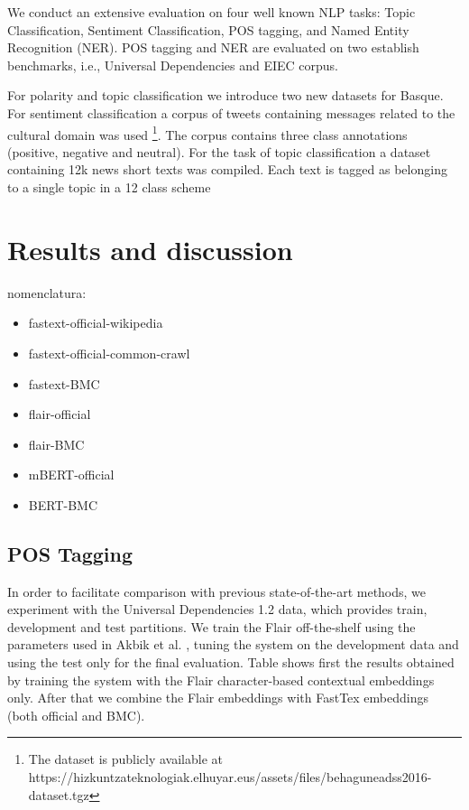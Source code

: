\documentclass[10pt, a4paper]{article}
\begin{document}
We conduct an extensive evaluation on four well known NLP tasks: Topic Classification, Sentiment Classification, POS tagging, and Named Entity Recognition (NER). POS tagging and NER are evaluated on two establish benchmarks, i.e., Universal Dependencies and EIEC corpus. 

For polarity and topic classification we introduce two new datasets for Basque. For sentiment classification a corpus of tweets containing messages related to the cultural domain was used \cite{san2019multilingual}\footnote{The dataset is publicly available at https://hizkuntzateknologiak.elhuyar.eus/assets/files/behaguneadss2016-dataset.tgz}. The corpus contains three class annotations (positive, negative and neutral). For the task of topic classification a dataset containing 12k news short texts was compiled. Each text is tagged as belonging to a single topic in a 12 class scheme



\section{Results and discussion}\label{sec:results-discussion}

nomenclatura: \begin{itemize}
    \item fastext-official-wikipedia 
    \item fastext-official-common-crawl 
    \item fastext-BMC
    \item flair-official
    \item flair-BMC
    \item mBERT-official
    \item BERT-BMC
\end{itemize}




\subsection{POS Tagging}\label{sec:pos-tagging}

In order to facilitate comparison with previous state-of-the-art methods, we experiment with the Universal Dependencies 1.2 data, which provides train, development and test partitions. We train the Flair off-the-shelf using the parameters used in Akbik et al. \cite{akbik2018coling}, tuning the system on the development data and using the test only for the final evaluation. Table shows first the results obtained by training the system with the Flair character-based contextual embeddings only. After that we combine the Flair embeddings with FastTex embeddings (both official and BMC).
\end{document}
